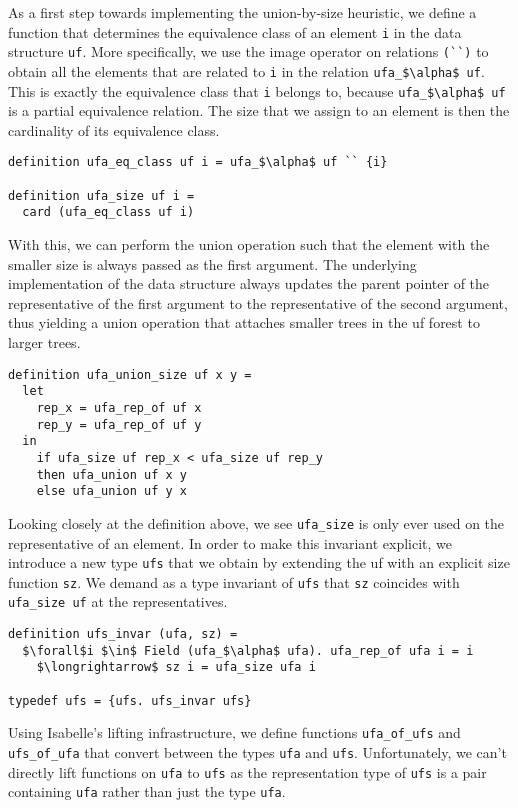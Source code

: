 \documentclass[
  sigplan,
  10pt,
  anonymous,
  review,
  ]{acmart}
\begin{document}
As a first step towards implementing the union-by-size heuristic, we define a function that determines the equivalence class of an element \lstinline|i| in the data structure \lstinline|uf|.
More specifically, we use the image operator on relations \lstinline|(``)| to obtain all the elements that are related to \lstinline|i| in the relation \lstinline|ufa_$\alpha$ uf|.
This is exactly the equivalence class that \lstinline|i| belongs to, because \lstinline|ufa_$\alpha$ uf| is a partial equivalence relation.
The size that we assign to an element is then the cardinality of its equivalence class.
\begin{lstlisting}
definition ufa_eq_class uf i = ufa_$\alpha$ uf `` {i}

definition ufa_size uf i =
  card (ufa_eq_class uf i)
\end{lstlisting}
With this, we can perform the union operation such that the element with the smaller size is always passed as the first argument. 
The underlying implementation of the data structure always updates the parent pointer of the representative of the first argument to the representative of the second argument,
thus yielding a union operation that attaches smaller trees in the \acrshort{uf} forest to larger trees.
\begin{lstlisting}
definition ufa_union_size uf x y =
  let
    rep_x = ufa_rep_of uf x
    rep_y = ufa_rep_of uf y
  in
    if ufa_size uf rep_x < ufa_size uf rep_y
    then ufa_union uf x y
    else ufa_union uf y x
\end{lstlisting}
Looking closely at the definition above, we see \lstinline|ufa_size| is only ever used on the representative of an element.
In order to make this invariant explicit, we introduce a new type \lstinline|ufs| that we obtain by extending the \acrshort{uf} with an explicit size function \lstinline|sz|.
We demand as a type invariant of \lstinline|ufs| that \lstinline|sz| coincides with \lstinline|ufa_size uf| at the representatives.
\begin{lstlisting}
definition ufs_invar (ufa, sz) =
  $\forall$i $\in$ Field (ufa_$\alpha$ ufa). ufa_rep_of ufa i = i
    $\longrightarrow$ sz i = ufa_size ufa i

typedef ufs = {ufs. ufs_invar ufs}
\end{lstlisting}
Using Isabelle's lifting infrastructure, we define functions \lstinline|ufa_of_ufs| and \lstinline|ufs_of_ufa| that convert between the types \lstinline|ufa| and \lstinline|ufs|.
Unfortunately, we can't directly lift functions on \lstinline|ufa| to \lstinline|ufs| as the representation type of \lstinline|ufs| is a pair containing \lstinline|ufa| rather than just the type \lstinline|ufa|.
\end{document}
